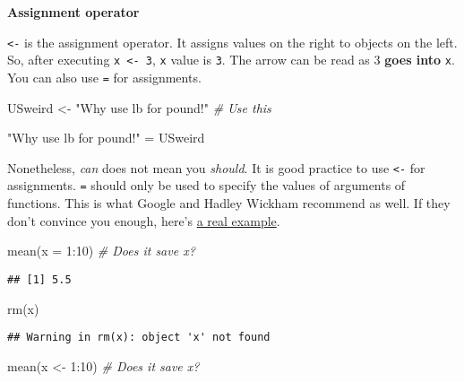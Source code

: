 \documentclass[
]{book}
\newenvironment{Shaded}{\begin{snugshade}}{\end{snugshade}}
\newcommand{\AttributeTok}[1]{\textcolor[rgb]{0.77,0.63,0.00}{#1}}
\newcommand{\CommentTok}[1]{\textcolor[rgb]{0.56,0.35,0.01}{\textit{#1}}}
\newcommand{\DecValTok}[1]{\textcolor[rgb]{0.00,0.00,0.81}{#1}}
\newcommand{\FunctionTok}[1]{\textcolor[rgb]{0.00,0.00,0.00}{#1}}
\newcommand{\NormalTok}[1]{#1}
\newcommand{\OtherTok}[1]{\textcolor[rgb]{0.56,0.35,0.01}{#1}}
\newcommand{\SpecialCharTok}[1]{\textcolor[rgb]{0.00,0.00,0.00}{#1}}
\newcommand{\StringTok}[1]{\textcolor[rgb]{0.31,0.60,0.02}{#1}}
\begin{document}
\textbf{Assignment operator}

\texttt{\textless{}-} is the assignment operator. It assigns values on the right to objects on the left. So, after executing \texttt{x\ \textless{}-\ 3}, \texttt{x} value is \texttt{3}. The arrow can be read as 3 \textbf{goes into} \texttt{x}. You can also use \texttt{=} for assignments.

\begin{Shaded}
\begin{Highlighting}[]
\NormalTok{USweird }\OtherTok{\textless{}{-}} \StringTok{"Why use lb for pound!"} \CommentTok{\# Use this}

\StringTok{"Why use lb for pound!"} \OtherTok{=}\NormalTok{ USweird}
\end{Highlighting}
\end{Shaded}

Nonetheless, \emph{can} does not mean you \emph{should}. It is good practice to use \texttt{\textless{}-} for assignments. \texttt{=} should only be used to specify the values of arguments of functions. This is what Google and Hadley Wickham recommend as well. If they don't convince you enough, here's \href{https://csgillespie.wordpress.com/2010/11/16/assignment-operators-in-r-vs/}{a real example}.

\begin{Shaded}
\begin{Highlighting}[]
\FunctionTok{mean}\NormalTok{(}\AttributeTok{x =} \DecValTok{1}\SpecialCharTok{:}\DecValTok{10}\NormalTok{) }\CommentTok{\# Does it save x?}
\end{Highlighting}
\end{Shaded}

\begin{verbatim}
## [1] 5.5
\end{verbatim}

\begin{Shaded}
\begin{Highlighting}[]
\FunctionTok{rm}\NormalTok{(x)}
\end{Highlighting}
\end{Shaded}

\begin{verbatim}
## Warning in rm(x): object 'x' not found
\end{verbatim}

\begin{Shaded}
\begin{Highlighting}[]
\FunctionTok{mean}\NormalTok{(x }\OtherTok{\textless{}{-}} \DecValTok{1}\SpecialCharTok{:}\DecValTok{10}\NormalTok{) }\CommentTok{\# Does it save x?}
\end{Highlighting}
\end{Shaded}
\end{document}

